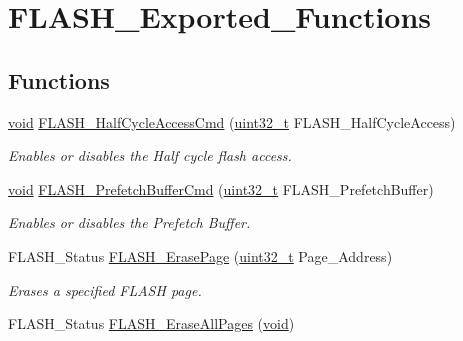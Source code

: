 \hypertarget{group___f_l_a_s_h___exported___functions}{\section{F\-L\-A\-S\-H\-\_\-\-Exported\-\_\-\-Functions}
\label{group___f_l_a_s_h___exported___functions}
}
\subsection*{Functions}
\begin{DoxyCompactItemize}
\item 
\hyperlink{group___n_a_m_e_ga18028b8badbf1ea7e704ccac3c488e82}{void} \hyperlink{group___f_l_a_s_h___exported___functions_ga978103a57b37920ac01128e999f9ece6}{F\-L\-A\-S\-H\-\_\-\-Half\-Cycle\-Access\-Cmd} (\hyperlink{stdint_8h_a435d1572bf3f880d55459d9805097f62}{uint32\-\_\-t} F\-L\-A\-S\-H\-\_\-\-Half\-Cycle\-Access)
\begin{DoxyCompactList}\small\item\em Enables or disables the Half cycle flash access. \end{DoxyCompactList}\item 
\hyperlink{group___n_a_m_e_ga18028b8badbf1ea7e704ccac3c488e82}{void} \hyperlink{group___f_l_a_s_h___exported___functions_ga6b93faaf0f560bf8d662b2cefe2f70e8}{F\-L\-A\-S\-H\-\_\-\-Prefetch\-Buffer\-Cmd} (\hyperlink{stdint_8h_a435d1572bf3f880d55459d9805097f62}{uint32\-\_\-t} F\-L\-A\-S\-H\-\_\-\-Prefetch\-Buffer)
\begin{DoxyCompactList}\small\item\em Enables or disables the Prefetch Buffer. \end{DoxyCompactList}\item 
F\-L\-A\-S\-H\-\_\-\-Status \hyperlink{group___f_l_a_s_h___exported___functions_ga13a2ca18bfb3d5fb827a2751799f8451}{F\-L\-A\-S\-H\-\_\-\-Erase\-Page} (\hyperlink{stdint_8h_a435d1572bf3f880d55459d9805097f62}{uint32\-\_\-t} Page\-\_\-\-Address)
\begin{DoxyCompactList}\small\item\em Erases a specified F\-L\-A\-S\-H page. \end{DoxyCompactList}\item 
F\-L\-A\-S\-H\-\_\-\-Status \hyperlink{group___f_l_a_s_h___exported___functions_gab2e6dea62c72b3e47c17512579d37498}{F\-L\-A\-S\-H\-\_\-\-Erase\-All\-Pages} (\hyperlink{group___n_a_m_e_ga18028b8badbf1ea7e704ccac3c488e82}{void})

\end{DoxyCompactItemize}
